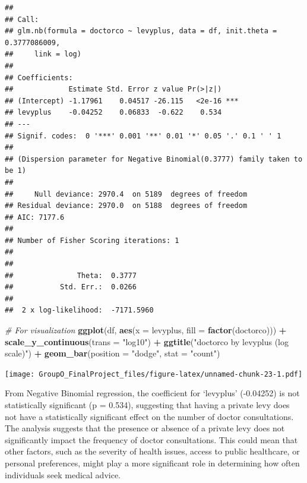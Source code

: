 \documentclass[
]{article}
\newenvironment{Shaded}{\begin{snugshade}}{\end{snugshade}}
\newcommand{\AttributeTok}[1]{\textcolor[rgb]{0.13,0.29,0.53}{#1}}
\newcommand{\CommentTok}[1]{\textcolor[rgb]{0.56,0.35,0.01}{\textit{#1}}}
\newcommand{\FunctionTok}[1]{\textcolor[rgb]{0.13,0.29,0.53}{\textbf{#1}}}
\newcommand{\NormalTok}[1]{#1}
\newcommand{\SpecialCharTok}[1]{\textcolor[rgb]{0.81,0.36,0.00}{\textbf{#1}}}
\newcommand{\StringTok}[1]{\textcolor[rgb]{0.31,0.60,0.02}{#1}}
\begin{document}
\begin{verbatim}
## 
## Call:
## glm.nb(formula = doctorco ~ levyplus, data = df, init.theta = 0.3777086009, 
##     link = log)
## 
## Coefficients:
##             Estimate Std. Error z value Pr(>|z|)    
## (Intercept) -1.17961    0.04517 -26.115   <2e-16 ***
## levyplus    -0.04252    0.06833  -0.622    0.534    
## ---
## Signif. codes:  0 '***' 0.001 '**' 0.01 '*' 0.05 '.' 0.1 ' ' 1
## 
## (Dispersion parameter for Negative Binomial(0.3777) family taken to be 1)
## 
##     Null deviance: 2970.4  on 5189  degrees of freedom
## Residual deviance: 2970.0  on 5188  degrees of freedom
## AIC: 7177.6
## 
## Number of Fisher Scoring iterations: 1
## 
## 
##               Theta:  0.3777 
##           Std. Err.:  0.0266 
## 
##  2 x log-likelihood:  -7171.5960
\end{verbatim}

\begin{Shaded}
\begin{Highlighting}[]
\CommentTok{\# For visualization}
\FunctionTok{ggplot}\NormalTok{(df, }\FunctionTok{aes}\NormalTok{(}\AttributeTok{x =}\NormalTok{ levyplus, }\AttributeTok{fill =} \FunctionTok{factor}\NormalTok{(doctorco))) }\SpecialCharTok{+} 
  \FunctionTok{scale\_y\_continuous}\NormalTok{(}\AttributeTok{trans =} \StringTok{"log10"}\NormalTok{) }\SpecialCharTok{+}
  \FunctionTok{ggtitle}\NormalTok{(}\StringTok{"\textquotesingle{}doctorco\textquotesingle{} by levyplus (log scale)"}\NormalTok{) }\SpecialCharTok{+}
  \FunctionTok{geom\_bar}\NormalTok{(}\AttributeTok{position =} \StringTok{"dodge"}\NormalTok{, }\AttributeTok{stat =} \StringTok{"count"}\NormalTok{)}
\end{Highlighting}
\end{Shaded}

\texttt{[image: GroupO\_FinalProject\_files/figure-latex/unnamed-chunk-23-1.pdf]}

From Negative Binomial regression, the coefficient for `levyplus'
(-0.04252) is not statistically significant (p = 0.534), suggesting that
having a private levy does not have a statistically significant effect
on the number of doctor consultations. The analysis suggests that the
presence or absence of a private levy does not significantly impact the
frequency of doctor consultations. This could mean that other factors,
such as the severity of health issues, access to public healthcare, or
personal preferences, might play a more significant role in determining
how often individuals seek medical advice.
\end{document}
